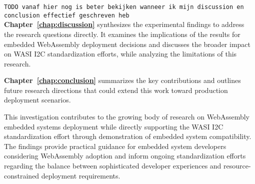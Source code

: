 \texttt{TODO vanaf hier nog is beter bekijken wanneer ik mijn discussion en conclusion effectief geschreven heb}\\
\textbf{Chapter~\ref{chap:discussion}} synthesizes the experimental findings to address the research questions directly. It examines the implications of the results for embedded WebAssembly deployment decisions and discusses the broader impact on WASI I2C standardization efforts, while analyzing the limitations of this research.

\textbf{Chapter~\ref{chap:conclusion}} summarizes the key contributions and outlines future research directions that could extend this work toward production deployment scenarios.

This investigation contributes to the growing body of research on WebAssembly embedded systems deployment while directly supporting the WASI I2C standardization effort through demonstration of embedded system compatibility. The findings provide practical guidance for embedded system developers considering WebAssembly adoption and inform ongoing standardization efforts regarding the balance between sophisticated developer experiences and resource-constrained deployment requirements.